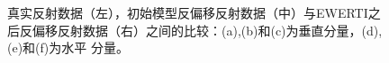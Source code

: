 \begin{figure}[!htb]
   \caption{真实反射数据（左），初始模型反偏移反射数据（中）与EWERTI之后反偏移反射数据（右）之间的比较：(a),(b)和(c)为垂直分量，(d),(e)和(f)为水平
   分量。}
   \label{fig:Data_comparison}
\end{figure}

